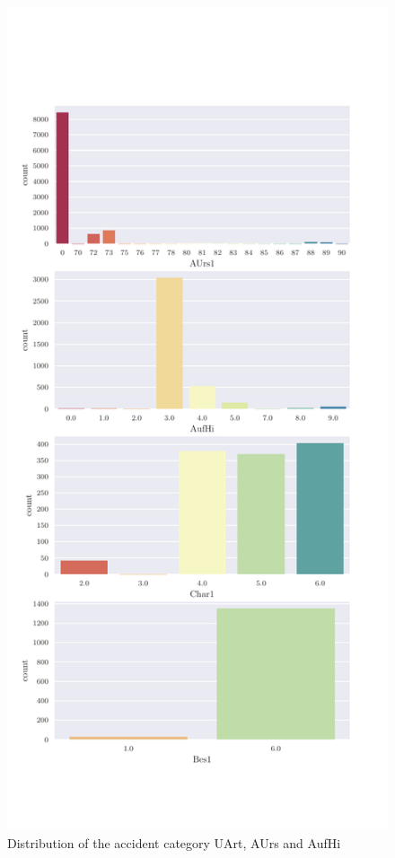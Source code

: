 \begin{appendices}
    \begin{figure}[!ht]
        \centering
        \includegraphics[scale=0.7]{CorrAnalysis/data/BAYSIS/01_dataset/plots/baysis_dataset_count_multiple02}
        \caption{Distribution of the accident category UArt, AUrs and AufHi}
        \label{img:appendix_baysis_dataset_AUrs}
        \label{img:appendix_baysis_dataset_AufHi}
    \end{figure}


\end{appendices}
